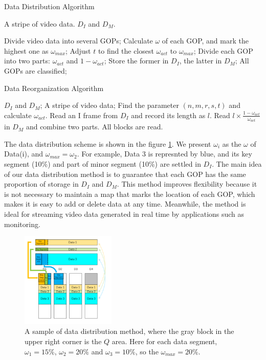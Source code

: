 \documentclass[sigconf]{acmart}
\begin{document}
\begin{algorithm}[htb] 
\caption{Data Distribution Algorithm} 
\label{alg-data-dist} 
\begin{algorithmic}[1] 

\Require A stripe of video data.
\Ensure $D_I$ and $D_M$.

\State Divide video data into several GOPs;
\State Calculate $\omega$ of each GOP, and mark the highest one as $\omega_{max}$;
\State Adjust $t$ to find the closest $\omega_{act}$ to $\omega_{max}$;
\Repeat 
\State Divide each GOP into two parts: $\omega_{act}$ and $1-\omega_{act}$;
\State Store the former in $D_I$, the latter in $D_M$;
\Until All GOPs are classified;
\end{algorithmic} 
\end{algorithm}


\begin{algorithm}[htb] 
\caption{Data Reorganization Algorithm} 
\label{alg-data-reor} 
\begin{algorithmic}[1] 
\Require $D_I$ and $D_M$;
\Ensure A stripe of video data;
\State Find the parameter $(n,m,r,s,t)$ and calculate $\omega_{act}$.
\Repeat
\State Read an I frame from $D_I$ and record its length as $l$.
\State Read $l \times \frac{1-\omega_{act}}{\omega_{act}}$ in $D_M$ and combine two parts.
\Until All blocks are read.
\end{algorithmic} 
\end{algorithm}

The data distribution scheme is shown in the figure \ref{Data-distribution-v2}. We present $\omega_i$ as the $\omega$ of Data(i), and $\omega_{max} = \omega_2$.
For example, Data 3 is represnted by blue, and its key segment (10\%) and part of minor segment (10\%) are settled in $D_I$.
The main idea of our data distribution method is to guarantee that each GOP has the same proportion of storage in $D_I$ and $D_M$. This method improves flexibility because it is not necessary to maintain a map that marks the location of each GOP, which makes it is easy to add or delete data at any time. Meanwhile, the method is ideal for streaming video data generated in real time by applications such as monitoring.

\begin{figure}[htb]
\centering
\includegraphics[width=0.4\textwidth]{photo/Data-distribution-v2.pdf}
\caption{A sample of data distribution method, where the gray block in the upper right corner is the $Q$ area. Here for each data segment, $\omega_1=15\%$, $\omega_2=20\%$ and $\omega_3=10\%$, so the $\omega_{max}=20\%$.}
\label{Data-distribution-v2}
\end{figure}
\end{document}
